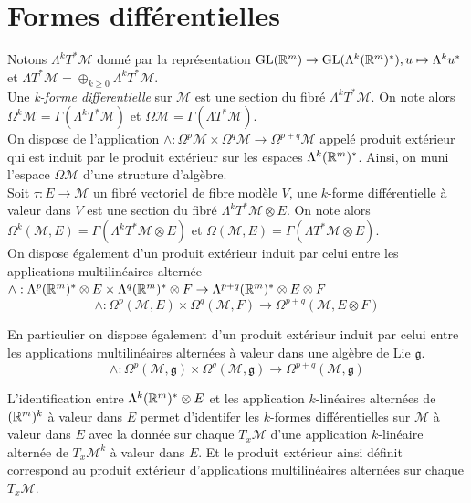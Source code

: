 \documentclass[12pt, a4paper]{book}
\begin{document}
\newpage
\section{Formes différentielles}

\begin{defi}
Notons $\Lambda^k T^*\mathcal{M}$ donné par la représentation $\operatorname{GL}(\mathbb{R}^m) \to \operatorname{GL}(\Lambda^k(\mathbb{R}^m)^*), u\mapsto \Lambda^k u^*$ et $\Lambda T^*\mathcal{M} = \oplus_{k\geq 0} \Lambda^k T^*\mathcal{M}$. \\
Une \emph{k-forme differentielle} sur $\mathcal{M}$ est une section du fibré $\Lambda^k T^*\mathcal{M}$. On note alors $\Omega^k\mathcal{M} = \Gamma(\Lambda^k T^*\mathcal{M})$ et $\Omega \mathcal{M} = \Gamma(\Lambda T^*\mathcal{M})$. \\

On dispose de l'application $\wedge : \Omega^p\mathcal{M} \times \Omega^q\mathcal{M} \to \Omega^{p+q}\mathcal{M}$ appelé produit extérieur qui est induit par le produit extérieur sur les espaces $\Lambda^k(\mathbb{R}^m)^*$. Ainsi, on muni l'espace $\Omega\mathcal{M}$ d'une structure d'algèbre. \\

Soit $\tau: E \to \mathcal{M}$ un fibré vectoriel de fibre modèle $V$, une $k$-forme différentielle à valeur dans $V$ est une section du fibré $\Lambda^k T^*\mathcal{M}\otimes E$. On note alors $\Omega^k(\mathcal{M}, E) = \Gamma(\Lambda^k T^*\mathcal{M}\otimes E)$ et $\Omega(\mathcal{M}, E) = \Gamma(\Lambda T^*\mathcal{M}\otimes E)$. \\

On dispose également d'un produit extérieur induit par celui entre les applications multilinéaires alternée $\wedge:\Lambda^p(\mathbb{R}^m)^* \otimes E \times \Lambda^q(\mathbb{R}^m)^* \otimes F \to \Lambda^{p+q}(\mathbb{R}^m)^* \otimes E \otimes F$  
$$\wedge: \Omega^p(\mathcal{M}, E) \times \Omega^q(\mathcal{M}, F) \to \Omega^{p+q}(\mathcal{M}, E\otimes F)$$

En particulier on dispose également d'un produit extérieur induit par celui entre les applications multilinéaires alternées à valeur dans une algèbre de Lie $\mathfrak{g}$.
$$\wedge: \Omega^p(\mathcal{M}, \mathfrak{g}) \times \Omega^q(\mathcal{M}, \mathfrak{g}) \to \Omega^{p+q}(\mathcal{M}, \mathfrak{g})$$
\end{defi}

\begin{rem}
L'identification entre $\Lambda^k(\mathbb{R}^m)^* \otimes E$ et les application $k$-linéaires alternées de $(\mathbb{R}^m)^k$ à valeur dans $E$ permet d'identifer les $k$-formes différentielles sur $\mathcal{M}$ à valeur dans $E$ avec la donnée sur chaque $T_x\mathcal{M}$ d'une application $k$-linéaire alternée de $T_x\mathcal{M}^k$ à valeur dans $E$. Et le produit extérieur ainsi définit correspond au produit extérieur d'applications multilinéaires alternées sur chaque $T_x\mathcal{M}$. 
\end{rem}
\end{document}
